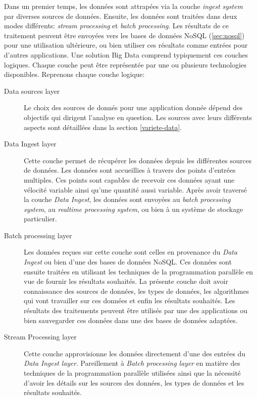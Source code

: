 		Dans un premier temps, les données sont   attrapées   via la couche  \textit{ingest system} par diverses sources de données. Ensuite, les données sont traitées dans deux modes différents:  \textit{stream processing } et  \textit{batch processing}.  Les résultats de ce traitement peuvent être envoyées vers les bases de données NoSQL (\ref{sec:nosql}) pour une utilisation ultérieure, ou bien  utiliser ces résultats comme entrées pour d'autres applications.  Une solution Big Data comprend typiquement  ces  couches logiques. Chaque  couche peut être représentée par une ou plusieurs technologies disponibles. Reprenons chaque couche logique:
		
		
		\begin{description}
			\item[Data sources layer] Le choix des sources de donnés pour une application donnée dépend des objectifs qui dirigent l'analyse en question. Les sources avec leurs différents aspects sont détaillées dans la section \ref{variete-data}.
		
			
		\item[Data Ingest layer] Cette couche permet de récupérer les données depuis les différentes sources de données. Les données sont accueillies à travers des points d'entrées multiples. Ces points  sont capables de recevoir  ces données ayant une vélocité variable ainsi qu'une quantité aussi variable.  Après avoir traversé  la couche \textit{Data Ingest}, les données sont envoyées au \textit{batch processing system}, au \textit{realtime processing system}, ou bien à un système de stockage particulier.
		
		\item[Batch processing layer] Les données reçues sur cette couche sont celles en provenance du \textit{Data Ingest} ou bien d'une des bases de données NoSQL. Ces données sont ensuite traitées en utilisant les techniques de la programmation parallèle en vue de fournir les résultats souhaités. La présente couche doit avoir connaissance des sources de données, les types de données, les algorithmes qui vont travailler sur ces données et enfin les résultats souhaités. Les résultats des traitements peuvent être utilisés par une des applications ou bien sauvegarder ces données dans une des bases de données adaptées.
		
		
		\item[Stream Processing layer] Cette couche approvisionne les données directement d'une des entrées du \textit{Data Ingest layer}. Pareillement  à  \textit{Batch processing layer} en matière  des techniques de la programmation parallèle utilisées ainsi que la nécessité d'avoir les détails sur les sources des données, les types de données et les résultats souhaités.
		

\end{description}
